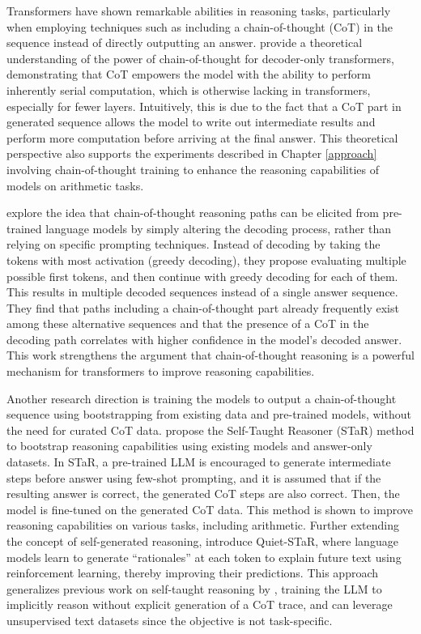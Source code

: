 Transformers have shown remarkable abilities in reasoning tasks, particularly when employing techniques such as including a chain-of-thought (CoT) in the sequence instead of directly outputting an answer. \cite{li_chain_2024} provide a theoretical understanding of the power of chain-of-thought for decoder-only transformers, demonstrating that CoT empowers the model with the ability to perform inherently serial computation, which is otherwise lacking in transformers, especially for fewer layers. Intuitively, this is due to the fact that a CoT part in generated sequence allows the model to write out intermediate results and perform more computation before arriving at the final answer. This theoretical perspective also supports the experiments described in Chapter \ref{approach} involving chain-of-thought training to enhance the reasoning capabilities of models on arithmetic tasks.

\cite{wang_cot_2024} explore the idea that chain-of-thought reasoning paths can be elicited from pre-trained language models by simply altering the decoding process, rather than relying on specific prompting techniques. Instead of decoding by taking the tokens with most activation (greedy decoding), they propose evaluating multiple possible first tokens, and then continue with greedy decoding for each of them. This results in multiple decoded sequences instead of a single answer sequence. They find that paths including a chain-of-thought part already frequently exist among these alternative sequences and that the presence of a CoT in the decoding path correlates with higher confidence in the model's decoded answer. This work strengthens the argument that chain-of-thought reasoning is a powerful mechanism for transformers to improve reasoning capabilities.

Another research direction is training the models to output a chain-of-thought sequence using bootstrapping from existing data and pre-trained models, without the need for curated CoT data. \cite{zelikman_star_2022} propose the Self-Taught Reasoner (STaR) method to bootstrap reasoning capabilities using existing models and answer-only datasets. In STaR, a pre-trained LLM is encouraged to generate intermediate steps before answer using few-shot prompting, and it is assumed that if the resulting answer is correct, the generated CoT steps are also correct. Then, the model is fine-tuned on the generated CoT data. This method is shown to improve reasoning capabilities on various tasks, including arithmetic. Further extending the concept of self-generated reasoning, \cite{zelikman_quiet-star_2024} introduce Quiet-STaR, where language models learn to generate ``rationales'' at each token to explain future text using reinforcement learning, thereby improving their predictions. This approach generalizes previous work on self-taught reasoning by \cite{zelikman_star_2022}, training the LLM to implicitly reason without explicit generation of a CoT trace, and can leverage unsupervised text datasets since the objective is not task-specific.

